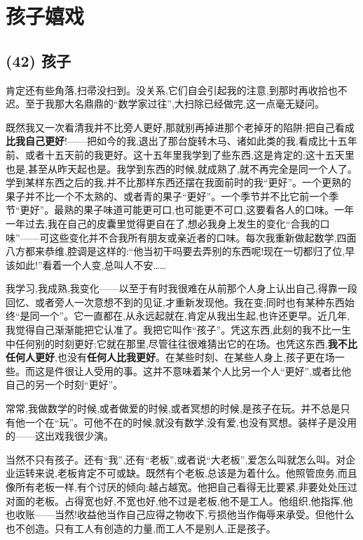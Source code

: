 \chapter{孩子嬉戏}

\section{(42) 孩子}

肯定还有些角落,扫帚没扫到。没关系,它们自会引起我的注意,到那时再收拾也不迟。至于我那大名鼎鼎的“数学家过往”,大扫除已经做完,这一点毫无疑问。

既然我又一次看清我并不比旁人更好,那就别再掉进那个老掉牙的陷阱:把自己看成\textbf{比我自己更好}!——把如今的我,退出了那台旋转木马、诸如此类的我,看成比十五年前、或者十五天前的我更好。这十五年里我学到了些东西,这是肯定的;这十五天里也是,甚至从昨天起也是。我学到东西的时候,就成熟了,就不再完全是同一个人了。学到某样东西之后的我,并不比那样东西还摆在我面前时的我“更好”。一个更熟的果子并不比一个不太熟的、或者青的果子“更好”。一个季节并不比它前一个季节“更好”。最熟的果子味道可能更可口,也可能更不可口,这要看各人的口味。一年一年过去,我在自己的皮囊里觉得更自在了,想必我身上发生的变化“合我的口味”——可这些变化并不合我所有朋友或亲近者的口味。每次我重新做起数学,四面八方都来恭维,腔调是这样的:“他当初干吗要去弄别的东西呢!现在一切都归了位,早该如此!”看着一个人变,总叫人不安……

 我学习,我成熟,我变化——以至于有时我很难在从前那个人身上认出自己,得靠一段回忆、或者旁人一次意想不到的见证,才重新发现他。我在变;同时也有某种东西始终“是同一个”。它一直都在,从永远起就在,肯定从我出生起,也许还更早。近几年,我觉得自己渐渐能把它认准了。我把它叫作“孩子”。凭这东西,此刻的我不比一生中任何别的时刻更好;它就在那里,尽管往往很难猜出它的在场。也凭这东西,\textbf{我不比任何人更好},也没有\textbf{任何人比我更好}。在某些时刻、在某些人身上,孩子更在场一些。而这是件很让人受用的事。这并不意味着某个人比另一个人“更好”,或者比他自己的另一个时刻“更好”。

常常,我做数学的时候,或者做爱的时候,或者冥想的时候,是孩子在玩。并不总是只有他一个在“玩”。可他不在的时候,就没有数学,没有爱,也没有冥想。装样子是没用的——这出戏我很少演。

 当然不只有孩子。还有“我”,还有“老板”,或者说“大老板”,爱怎么叫就怎么叫。对企业运转来说,老板肯定不可或缺。既然有个老板,总该是为着什么。他照管庶务,而且像所有老板一样,有个讨厌的倾向:越占越宽。他把自己看得无比要紧,非要处处压过对面的老板。占得宽也好,不宽也好,他不过是老板,他不是工人。他组织,他指挥,他也收账——当然!收益他当作自己应得之物收下,亏损他当作侮辱来承受。但他什么也不创造。只有工人有创造的力量,而工人不是别人,正是孩子。

